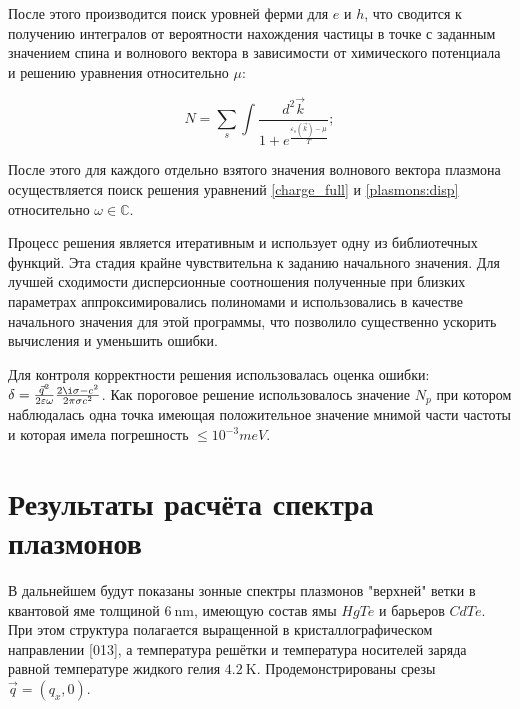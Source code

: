 \documentclass[../main.tex]{subfiles}
\begin{document}
    После этого производится поиск уровней ферми для $e$ и $h$, что сводится к получению
    интегралов от вероятности нахождения частицы в точке с заданным значением спина
    и волнового вектора в зависимости от химического потенциала и решению 
    уравнения относительно $\mu$:

    \begin{equation}
        N = \sum_s \int \frac{d^2 \vec k}{1 + e^\frac{\varepsilon_s(\vec k) - \mu}{T}};
    \end{equation}

    После этого для каждого отдельно взятого значения волнового вектора плазмона 
    осуществляется поиск решения уравнений \ref{charge_full} и \ref{plasmons:disp}
    относительно $\omega \in \mathbb{C}$.

    Процесс решения является итеративным и использует одну из библиотечных функций.
    Эта стадия крайне чувствительна к заданию начального значения. Для лучшей 
    сходимости дисперсионные соотношения полученные при близких параметрах 
    аппроксимировались полиномами и использовались в качестве начального значения для
    этой программы, что позволило существенно ускорить вычисления и уменьшить ошибки.


    Для контроля корректности решения использовалась оценка ошибки:
    $\delta = \frac{\vec{q}^2}{2 \varepsilon \omega} \frac{2\i \sigma - c^2}{2\pi \sigma c^2}$. 
    Как пороговое решение использовалось значение $N_p$ при котором наблюдалась 
    одна точка имеющая положительное значение мнимой части частоты и которая 
    имела погрешность $\leq 10^{-3} meV$.


    \section{Результаты расчёта спектра плазмонов}


    В дальнейшем будут показаны зонные спектры плазмонов "верхней" ветки в 
    квантовой яме толщиной $6~\text{nm}$, имеющую состав ямы $HgTe$ и 
    барьеров $CdTe$. При этом структура полагается выращенной в кристаллографическом
    направлении [013], а температура решётки и температура носителей заряда равной 
    температуре жидкого гелия $4.2~\text{K}$. Продемонстрированы срезы 
    $\vec q = (q_x, 0)$.
\end{document}
